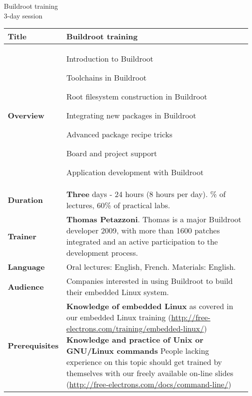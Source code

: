 \documentclass[a4paper,12pt,obeyspaces,spaces,hyphens]{article}
\begin{document}
\thispagestyle{fancy}

\setlength{\arrayrulewidth}{0.8pt}

\begin{center}
\LARGE
Buildroot training\\
\large
3-day session
\end{center}
\vspace{1cm}

\small
{}

 {
  \begin{tabularx}{\textwidth}{|g|h|}
    {\bf Title} & Buildroot training \\
    \hline

    {\bf Overview} &
    Introduction to Buildroot \par
    Toolchains in Buildroot \par
    Root filesystem construction in Buildroot \par
    Integrating new packages in Buildroot \par
    Advanced package recipe tricks \par
    Board and project support \par
    Application development with Buildroot \\
    \hline

    {\bf Duration} & {\bf Three} days - 24 hours (8 hours per day).
    \% of lectures, 60\% of practical labs. \\
    \hline

    {\bf Trainer} & {\bf Thomas Petazzoni}. Thomas is a major
    Buildroot developer 2009, with more than 1600 patches integrated
    and an active
    participation to the development process.\\
    \hline

    {\bf Language} & Oral lectures: English, French.
    \newline Materials: English.\\
    \hline

    {\bf Audience} & Companies interested in using Buildroot to build
    their
    embedded Linux system.\\
    \hline

    {\bf Prerequisites} & {\bf Knowledge of embedded Linux} as covered
    in our embedded Linux training
    (\url{http://free-electrons.com/training/embedded-linux/}) \newline 
    {\bf Knowledge and practice of Unix or GNU/Linux commands}
    \newline People lacking experience on this topic should get
    trained by themselves with our freely available on-line slides
    (\url{http://free-electrons.com/docs/command-line/}) \\
    \hline


\end{tabularx}}
\end{document}
